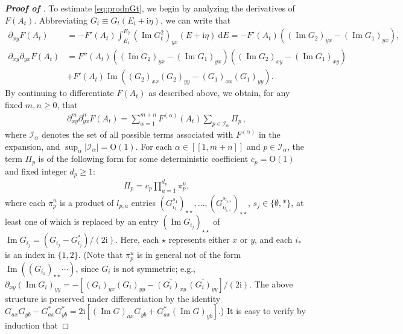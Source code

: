 \documentclass[10pt,reqno]{amsart}
\numberwithin{equation}{section}
\numberwithin{figure}{section}
\theoremstyle{plain} %
\theoremstyle{definition} %
\newcommand{\ii}{\mathrm{i}}
\renewcommand{\geq}{\ge}
\newcommand{\qq}[1]{[\![{#1}]\!]}
\newcommand{\pa}[1]{\left({#1}\right)}
\newcommand{\absa}[1]{\left\lvert #1 \right\rvert}
\DeclareMathOperator{\im}{\mathrm{Im}}
\newcommand{\rd}{\mathrm{d}}
\newcommand{\OO}{\mathrm{O}}
\numberwithin{equation}{section}
\begin{document}
\begin{proof}[\bf Proof of ]
To estimate \eqref{eq:prodnGt}, we begin by analyzing the derivatives of $F(A_t)$. Abbreviating $G_i \equiv  G_t(E_i + \ii \eta)$, we can write that  
\begin{align}\label{partial_xy_F_A_t}
\partial_{xy}F\pa{A_t}&=-F'\pa{A_t}\int_{E_1}^{E_2} \pa{ \im G_t^2}_{yx}\pa{E+\ii \eta}\  \rd E=-F'\pa{A_t}\pa{ \pa{\im G_2}_{yx}- \pa{\im G_1}_{yx}},\\
\label{partial_xy_partial_yx_F_A_t}
        \partial_{xy}\partial_{yx}F\pa{A_t}&= F''\pa{A_t}\pa{\pa{\im G_2}_{yx}-\pa{\im G_1}_{yx}}\pa{\pa{\im G_2}_{xy}-\pa{\im G_1}_{xy}}\\
        & +F'\pa{A_t}\im \pa{\pa{G_2}_{xx}\pa{G_2}_{yy}-\pa{G_1}_{xx}\pa{G_1}_{yy}}.\nonumber
\end{align}
By continuing to differentiate $F(A_t)$ as described above, we obtain, for any fixed $m, n \geq 0$, that
\begin{equation}\nonumber
    \begin{aligned}
        \partial_{xy}^{m}\partial_{yx}^{n}F\pa{A_t}=\sum_{\alpha=1}^{m+n}F^{\pa{\alpha}}\pa{A_t}\sum_{p\in \mathscr{I}_{\alpha}}\Pi_{p} \, ,
    \end{aligned}
\end{equation}
where $\mathscr{I}_{\alpha}$ denotes the set of all possible terms associated with $F^{(\alpha)}$ in the expansion, and $\sup_{\alpha}\absa{\mathscr{I}_{\alpha}}=\OO\pa{1}$. 
For each $\alpha\in\qq{1,m+n}$ and $p\in\mathscr{I}_{\alpha}$, the term $\Pi_p$ is of the following form for some deterministic coefficient $c_p=\OO(1)$ and fixed integer $d_p\ge 1$: 
\begin{equation}\nonumber
    \begin{aligned}
        \Pi_p=c_p\prod_{u=1}^{d_p}\pi_p^u ,
    \end{aligned}
\end{equation}
where each $\pi_p^u$ is a product of $l_{p,u}$ entries $\pa{G_{i_1}^{s_1}}_{\star\star},\ldots,\pa{G_{i_{l_{p,u}}}^{s_{l_{p,u}}}}_{\star\star}$, $s_j\in\{\emptyset,*\}$, at least one of which is replaced by an entry $\pa{\im G_{i_j}}_{\star\star}$ of $\im G_{i_j}=(G_{i_j}-G_{i_j}^*)/(2\ii)$. Here, each $\star$ represents either $x$ or $y$, and each $i_*$ is an index in $\{1,2\}$. (Note that $\pi_p^u$ is in general not of the form $\im ((G_{i_1})_{\star\star}\cdots)$, since $G_i$ is not symmetric; e.g., $\partial_{xy}(\im G_i)_{yy}=-[(G_i)_{yx}(G_i)_{yy}-\overline{(G_i)_{xy}}\,\overline{(G_i)_{yy}}]/(2\ii)$. The above structure is preserved under differentiation by the identity $G_{ax}G_{yb}-G^*_{ax}G^*_{yb}=2\ii[(\im G)_{ax}G_{yb}+G^*_{ax}(\im G)_{yb}]$.) It is easy to verify by induction that

\end{proof}
\end{document}
